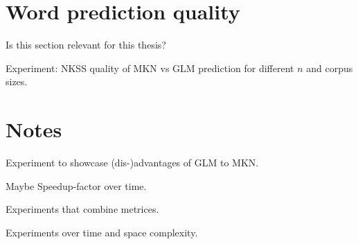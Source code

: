 \section{Word prediction quality}

\begin{draft}
Is this section relevant for this thesis?

Experiment: NKSS quality of MKN vs GLM prediction for different $n$ and corpus
sizes.
\end{draft}


\section{Notes}

\begin{draft}
Experiment to showcase (dis-)advantages of GLM to MKN.

Maybe Speedup-factor over time.

Experiments that combine metrices.

Experiments over time and space complexity.
\end{draft}
